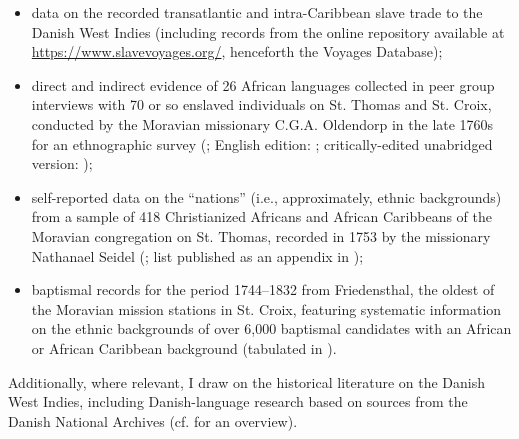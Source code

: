 \documentclass[output=paper,colorlinks,citecolor=brown]{langscibook}
\begin{document}
\begin{itemize}[label=-]
    \item data on the recorded transatlantic and intra-Caribbean slave trade to the Danish West Indies (including records from the online repository available at \url{https://www.slavevoyages.org/}, henceforth the Voyages Database);

    \item direct and indirect evidence of 26 African languages collected in peer group interviews with 70 or so enslaved individuals on St. Thomas and St. Croix, conducted by the Moravian missionary C.G.A. Oldendorp in the late 1760s for an ethnographic survey (\cite{Oldendorp_1777}; English edition: \cite{Highfield_1987}; critically-edited unabridged version: \cite{Oldendorp_2000, Oldendorp_2002});

    \item self-reported data on the ``nations'' (i.e., approximately, ethnic backgrounds) from a sample of 418 Christianized Africans and African Caribbeans of the Moravian congregation on St. Thomas, recorded in 1753 by the missionary Nathanael Seidel (\cite{Seidel_1753}; list published as an appendix in \cite{Sebro_2010});

    \item baptismal records for the period 1744–1832 from Friedensthal, the oldest of the Moravian mission stations in St. Croix, featuring systematic information on the ethnic backgrounds of over 6,000 baptismal candidates with an African or African Caribbean background (tabulated in \cite{Pope_1970}).
\end{itemize}

Additionally, where relevant, I draw on the historical literature on the Danish West Indies, including Danish-language research based on sources from the Danish National Archives (cf. \cite{JensenSimonsen_2016} for an overview).
\end{document}
